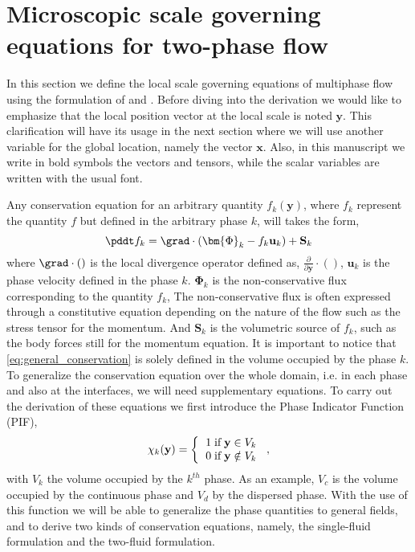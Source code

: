 
\section{Microscopic scale governing equations for two-phase flow}
\label{sec:conservation_laws}

In this section we define the local scale governing equations of multiphase flow using the formulation of \citet{kataoka1986local} and \citet{drew1983mathematical}. 
Before diving into the derivation we would like to emphasize that the local position vector at the local scale is noted $\textbf{y}$.
This clarification will have its usage in the next section where we will use another variable for the global location, namely the vector $\textbf{x}$. 
Also, in this manuscript we write in bold symbols the vectors and tensors, while the scalar variables are written with the usual font. 

Any conservation equation for an arbitrary quantity $f_k(\textbf{y})$, where $f_k$ represent the quantity $f$ but defined in the arbitrary phase $k$, will takes the form,
\begin{equation}
    \pddt f_k
    = \grad \cdot \left(
        \bm{\Phi}_k
        - f_k\textbf{u}_k
        \right)
    + \textbf{S}_k
    \label{eq:general_conservation}
\end{equation}
where $\grad\cdot()$ is the local divergence operator defined as, $\frac{\partial}{\partial \textbf{y}}\cdot()$, $\textbf{u}_k$ is the phase velocity defined in the phase $k$. 
$\bm{\Phi}_k$ is the non-conservative flux corresponding to the quantity $f_k$,
The non-conservative flux is often expressed through a constitutive equation depending on the nature of the flow such as the stress tensor for the momentum. 
And $\textbf{S}_k$ is the volumetric source of $f_k$, such as the body forces still for the momentum equation.
It is important to notice that \ref{eq:general_conservation} is solely defined in the volume occupied by the phase $k$.
To generalize the conservation equation over the whole domain, i.e. in each phase and also at the interfaces, we will need supplementary equations. 
To carry out the derivation of these equations we first introduce the Phase Indicator Function (PIF),
\begin{equation}
    \chi_k(\textbf{y}) =  \left\{
      \begin{tabular}{cc}
        $1 \;\text{if} \;\textbf{y} \in V_k$\\
        $0 \;\text{if} \;\textbf{y} \notin V_k$
      \end{tabular}
      \right.,
      \label{eq:phase_indicator}
\end{equation}
with $V_k$ the volume occupied by the $k^{th}$ phase.
As an example, $V_c$ is the volume occupied by the continuous phase and $V_d$ by the dispersed phase. 
With the use of this function we will be able to generalize the phase quantities to general fields, and to derive two kinds of conservation equations, namely, the single-fluid formulation and the two-fluid formulation. 

